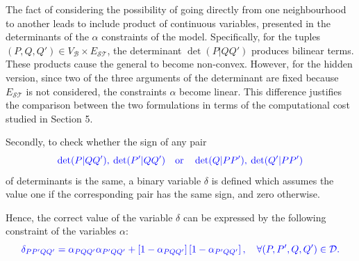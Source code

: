 \documentclass[a4paper,  review, authoryear, 1p.]{elsarticle}
\newcommand{\KMPN}{{\sf{H-KMPN}\xspace }}
\newcommand{\VB}{{V^{}_{\mathcal B}}}
\newcommand{\JP}[1]{{\color{blue}#1}}
\newcommand{\CV}[1]{{\color{blue}#1}}
\newcommand{\determinant}[3]{\det({#1|#2#3})}
\begin{document}
	\JP{The fact of considering the possibility of going directly from one neighbourhood  to another leads to include product of continuous variables, presented in the determinants of the $\alpha$ constraints of the model. Specifically, for the tuples $(P, Q, Q')\in V_\mathcal B\times E_{\mathcal S\mathcal T}$, the determinant $\det(P|QQ')$ produces bilinear terms. These products cause the general \KMPN to become non-convex. However, for the hidden version, since two of the three arguments of the determinant are fixed because $E_{\mathcal S\mathcal T}$ is not considered, the constraints $\alpha$ become linear. This difference justifies the comparison between the two formulations in terms of the computational cost studied in Section 5.}
			 
	Secondly, to check whether the sign of any pair
	\begin{equation}\label{eq:pair}
		\CV{\determinant{P}{Q}{Q'},\: \determinant{P'}{Q}{Q'}\quad \text{or} \quad \determinant{Q}{P}{P'},\:	 \determinant{Q'}{P}{P'}}
	\end{equation} 
	of determinants is the same, a binary variable $\delta$ is defined which assumes the value one if the corresponding pair has the same sign, and zero otherwise.
	
	\newcommand{\varepsilonprod}[4]{\varepsilon_{#1#2#3#4}}
	
	Hence, the correct value of the variable $\delta$ can be expressed by the following constraint of the variables $\alpha$:
	\begin{equation*}%
		\CV{\deltamas{P}{P'}{Q}{Q'}=\alphamas{P}{Q}{Q'}\alphamas{P'}{Q}{Q'} + \left[1-\alphamas{P}{Q}{Q'}\right]\left[1-\alphamas{P'}{Q}{Q'}\right],\quad\forall (P,P',Q,Q')\in\mathcal D.}	
	\end{equation*}
	
\end{document}
